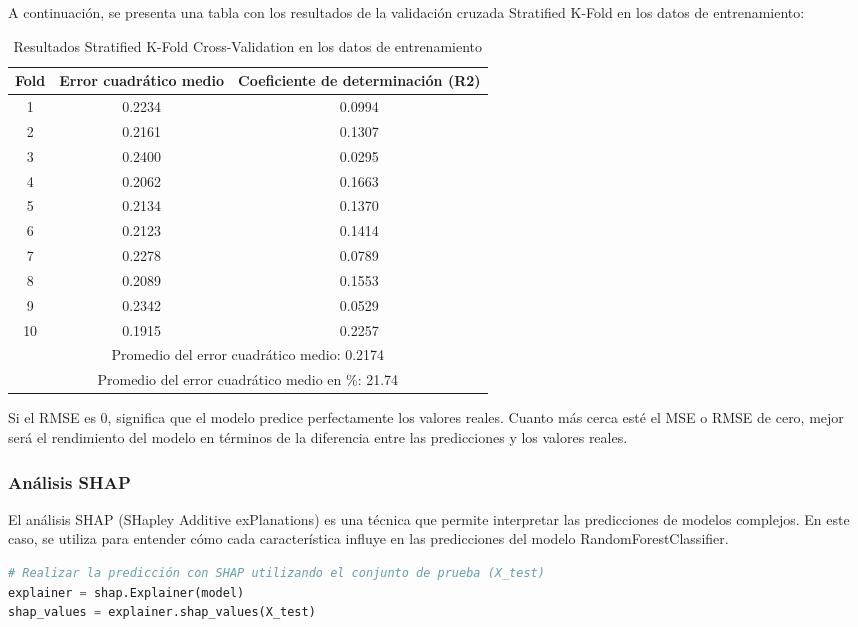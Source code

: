 A continuación, se presenta una tabla con los resultados de la validación cruzada Stratified K-Fold en los datos de entrenamiento:

\begin{table}[ht]
    \centering
    \caption{Resultados Stratified K-Fold Cross-Validation en los datos de entrenamiento}
    \label{lst:res_skfold_train}%
    \begin{tabular}{ccc}
        \hline
        \textbf{Fold} & \textbf{Error cuadrático medio} & \textbf{Coeficiente de determinación (R2)} \\
        \hline
        1 & 0.2234 & 0.0994 \\
        2 & 0.2161 & 0.1307 \\
        3 & 0.2400 & 0.0295 \\
        4 & 0.2062 & 0.1663 \\
        5 & 0.2134 & 0.1370 \\
        6 & 0.2123 & 0.1414 \\
        7 & 0.2278 & 0.0789 \\
        8 & 0.2089 & 0.1553 \\
        9 & 0.2342 & 0.0529 \\
        10 & 0.1915 & 0.2257 \\
        \hline
        \multicolumn{3}{c}{Promedio del error cuadrático medio: 0.2174} \\
        \multicolumn{3}{c}{Promedio del error cuadrático medio en \%: 21.74} \\
        \hline
    \end{tabular}%
\end{table}%


Si el RMSE es 0, significa que el modelo predice perfectamente los valores reales. Cuanto más cerca esté el MSE o RMSE de cero, mejor será el rendimiento del modelo en términos de la diferencia entre las predicciones y los valores reales.


\subsubsection{Análisis SHAP}

El análisis SHAP (SHapley Additive exPlanations) es una técnica que permite interpretar las predicciones de modelos complejos. En este caso, se utiliza para entender cómo cada característica influye en las predicciones del modelo RandomForestClassifier.

\begin{lstlisting}[language=Python, caption=Predicción con SHAP utilizando el conjunto de prueba, label=lst:shap_analysis]
# Realizar la predicción con SHAP utilizando el conjunto de prueba (X_test)
explainer = shap.Explainer(model)
shap_values = explainer.shap_values(X_test)
\end{lstlisting}


